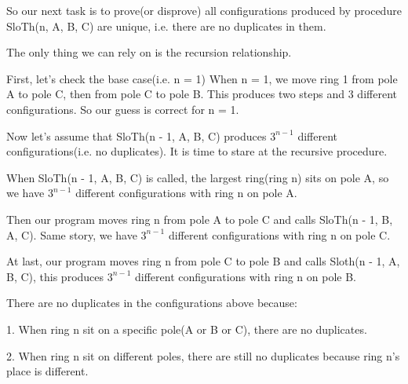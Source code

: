 \documentclass[a4paper,11pt]{article}
\theoremstyle{mytheor}
\begin{document}
So our next task is to prove(or disprove) all configurations produced by procedure SloTh(n, A, B, C) are unique, i.e. there are no duplicates in them.

The only thing we can rely on is the recursion relationship.

First, let's check the base case(i.e. n = 1)
When n = 1, we move ring 1 from pole A to pole C, then from pole C to pole B. This produces two steps and 3 different configurations. So our guess is correct for n = 1.

Now let's assume that SloTh(n - 1, A, B, C) produces $3^{n-1}$ different configurations(i.e. no duplicates). It is time to stare at the recursive procedure.

When SloTh(n - 1, A, B, C) is called, the largest ring(ring n) sits on pole A, so we have $3^{n-1}$ different configurations with ring n on pole A.

Then our program moves ring n from pole A to pole C and calls SloTh(n - 1, B, A, C). Same story, we have $3^{n-1}$ different configurations with ring n on pole C.

At last, our program moves ring n from pole C to pole B and calls Sloth(n - 1, A, B, C), this produces $3^{n-1}$ different configurations with ring n on pole B.

There are no duplicates in the configurations above because:

1. When ring n sit on a specific pole(A or B or C), there are no duplicates.

2. When ring n sit on different poles, there are still no duplicates because ring n's place is different.
\end{document}
